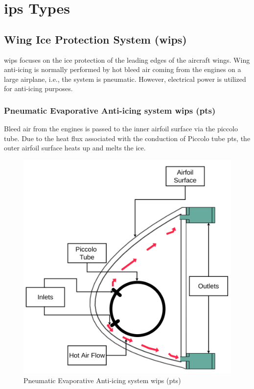 \documentclass[english]{kththesis}
\begin{document}
\section{\acrshort{ips} Types}
\label{sec:IPSfunction}
\subsection{Wing Ice Protection System (\acrshort{wips})}
\label{subsec:WIPS}
\acrshort{wips} focuses on the ice protection of the leading edges of the aircraft wings. Wing anti-icing is normally performed by hot bleed air coming from the engines on a large airplane, i.e., the system is pneumatic. However, electrical power is utilized for anti-icing purposes.
\subsubsection{Pneumatic Evaporative Anti-icing system \acrshort{wips} (\acrshort{pts})} 
Bleed air from the engines is passed to the inner airfoil surface via the piccolo tube. Due to the heat flux associated with the conduction of Piccolo tube \acrshort{pts}, the outer airfoil surface heats up and melts the ice.

\begin{figure}[H]
    \centering
\graphicspath{ {IPS/} }
\includegraphics[width=1\textwidth,height=\textheight,scale=3.5,keepaspectratio]{Pneumatic Evaporative Anti-icing system or Piccolo Tube System.png}
\caption {Pneumatic Evaporative Anti-icing system \acrshort{wips} (\acrshort{pts})}
\label{fig:PTS}
\end{figure}
\end{document}
